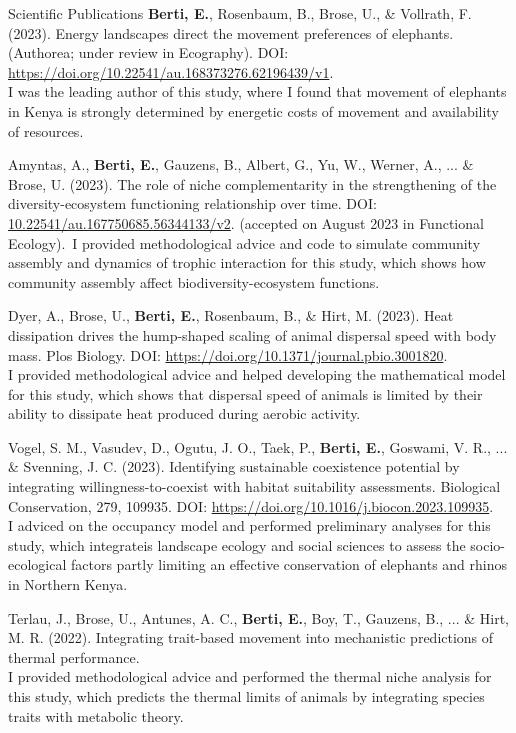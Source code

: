 \documentclass{resume} %
\begin{document}
\begin{rSection}{Scientific Publications}
\textbf{Berti, E.}, Rosenbaum, B., Brose, U., \& Vollrath, F. (2023). Energy landscapes direct the movement preferences of elephants. (Authorea; under review in Ecography). DOI: \url{https://doi.org/10.22541/au.168373276.62196439/v1}.\\
I was the leading author of this study, where I found that movement of elephants in Kenya is strongly determined by energetic costs of movement and availability of resources.

	Amyntas, A., \textbf{Berti, E.}, Gauzens, B., Albert, G., Yu, W., Werner, A., ... \& Brose, U. (2023). The role of niche complementarity in the strengthening of the diversity-ecosystem functioning relationship over time. DOI: \url{10.22541/au.167750685.56344133/v2}. (accepted on August 2023 in Functional Ecology).\
	I provided methodological advice and code to simulate community assembly and dynamics of trophic interaction for this study, which shows how community assembly affect biodiversity-ecosystem functions.

Dyer, A., Brose, U., \textbf{Berti, E.}, Rosenbaum, B., \& Hirt, M. (2023). Heat dissipation drives the hump-shaped scaling of animal dispersal speed with body mass. Plos Biology. DOI: \url{https://doi.org/10.1371/journal.pbio.3001820}.\\
I provided methodological advice and helped developing the mathematical model for this study, which shows that dispersal speed of animals is limited by their ability to dissipate heat produced during aerobic activity.

	Vogel, S. M., Vasudev, D., Ogutu, J. O., Taek, P., \textbf{Berti, E.}, Goswami, V. R., ... \& Svenning, J. C. (2023). Identifying sustainable coexistence potential by integrating willingness-to-coexist with habitat suitability assessments. Biological Conservation, 279, 109935. DOI: \url{https://doi.org/10.1016/j.biocon.2023.109935}.\\
	I adviced on the occupancy model and performed preliminary analyses for this study, which integrateis landscape ecology and social sciences to assess the socio-ecological factors partly limiting an effective conservation of elephants and rhinos in Northern Kenya.

Terlau, J., Brose, U., Antunes, A. C., \textbf{Berti, E.}, Boy, T., Gauzens, B., ... \& Hirt, M. R. (2022). Integrating trait-based movement into mechanistic predictions of thermal performance.\\
I provided methodological advice and performed the thermal niche analysis for this study, which predicts the thermal limits of animals by integrating species traits with metabolic theory.


\end{rSection}
\end{document}

